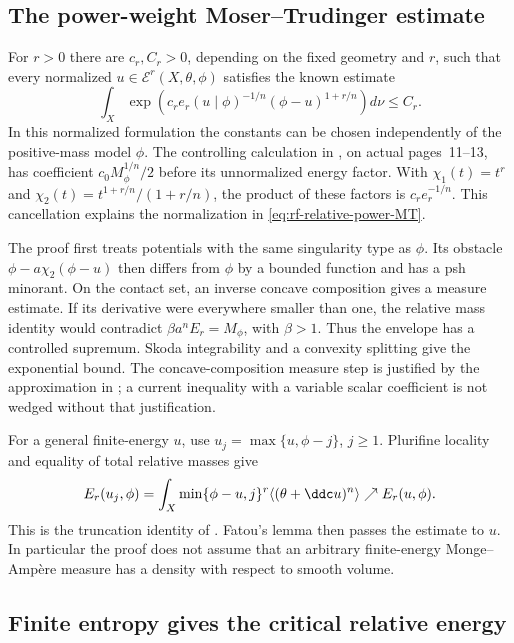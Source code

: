 \subsection{The power-weight Moser--Trudinger estimate}
\label{sec:rf-relative-power-MT}

For $r>0$ there are $c_r,C_r>0$, depending on the fixed geometry and
$r$, such that every normalized $u\in\mathcal E^r(X,\theta,\phi)$
satisfies the known estimate
\[
\tag{65.68}\label{eq:rf-relative-power-MT}
 \int_X\exp\!\left(
       c_r e_r(u\mid\phi)^{-1/n}
                  (\phi-u)^{1+r/n}\right)d\nu\leq C_r.
\]
In this normalized formulation the constants can be chosen independently
of the positive-mass model $\phi$. The controlling calculation in
\cite[Theorem~3.5]{DNTT24EntropyPublished}, on actual pages~11--13,
has coefficient $c_0M_\phi^{1/n}/2$ before its unnormalized energy
factor. With $\chi_1(t)=t^r$ and
$\chi_2(t)=t^{1+r/n}/(1+r/n)$, the product of these factors is
$c_r e_r^{-1/n}$. This cancellation explains the normalization in
\eqref{eq:rf-relative-power-MT}.

The proof first treats potentials with the same singularity type as
$\phi$. Its obstacle $\phi-a\chi_2(\phi-u)$ then differs from
$\phi$ by a bounded function and has a psh minorant. On the contact
set, an inverse concave composition gives a measure estimate. If its
derivative were everywhere smaller than one, the relative mass identity
would contradict $\beta a^n E_r=M_\phi$, with $\beta>1$.
Thus the envelope has a controlled supremum. Skoda integrability and
a convexity splitting give the exponential bound.
The concave-composition measure step is justified by the approximation
in \cite[Lemma~5.19]{DDL23RelativeV2}; a current inequality with a
variable scalar coefficient is not wedged without that justification.

For a general finite-energy $u$, use
$u_j=\max\{u,\phi-j\}$, $j\geq1$.
Plurifine locality and equality of total relative masses give
\[
 E_r(u_j,\phi)
    =\int_X\min\{\phi-u,j\}^{r}
                    \langle(\theta+\ddc u)^n\rangle
       \nearrow E_r(u,\phi).
\]
This is the truncation identity of
\cite[Lemma~2.5]{DNTT24EntropyPublished}.
Fatou's lemma then passes the estimate to $u$.
In particular the proof does not assume that an arbitrary finite-energy
Monge--Amp\`ere measure has a density with respect to smooth volume.

\subsection{Finite entropy gives the critical relative energy}
\label{sec:rf-relative-finite-entropy}

